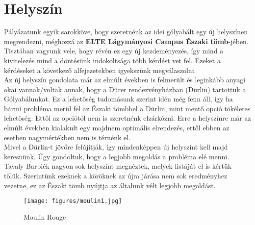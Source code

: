 \chapter{Helyszín}\label{sect:Place}
\hspace{2mm} Pályázatunk egyik sarokköve, hogy szeretnénk az idei gólyabált egy új helyszínen megrendezni, méghozzá az \textbf{ELTE Lágymányosi Campus Északi tömb}-jében. Tisztában vagyunk vele, hogy révén ez egy új kezdeményezés, így mind a kivitelezés mind a döntésünk indokoltsága több kérdést vet fel. Ezeket a kérdéseket a következő alfejezetekben igyekszünk megválaszolni.\\
\indent Az új helyszín gondolata már az elmúlt években is felmerült és leginkább anyagi okai vannak/voltak annak, hogy a Dürer rendezvényházban (Dürlin) tartottuk a Gólyabálunkat. Ez a lehetőség tudomásunk szerint idén még fenn áll, így ha bármi probléma merül fel az Északi tömbbel a Dürlin, mint mentő opció tökéletes lehetőség. Ettől az opciótól nem is szeretnénk elzárkózni. Erre a helyszínre már az elmúlt években kialakult egy majdnem optimális elrendezés, ettől ebben az esetben nagymértékben nem is térnénk el.\\
\indent Mivel a Dürlin-t jövőre felújítják, így mindenképpen új helyszínt kell majd keresnünk. Úgy gondoltuk, hogy a legjobb megoldás a probléma elé menni. Tavaly Barbiék nagyon sok helyszínt megnéztek, melyek listáját el is kértük tőlük. Szerintünk ezeknek a köröknek az újra járása nem sok eredményhez vezetne, ez az Északi tömb nyújtja az általunk vélt legjobb megoldást.
\begin{wrapfigure}[10]{l}{0.40\textwidth} 
\begin{center}
\texttt{[image: figures/moulin1.jpg]}
\end{center}
\caption{Moulin Rouge} 
\label{fig:Moulin}
\end{wrapfigure}

